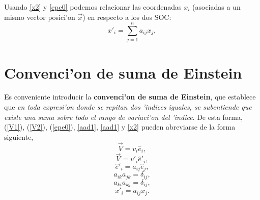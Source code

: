 Usando \eqref{x2} y \eqref{epe0} podemos relacionar las coordenadas $x_i$ (asociadas a un mismo vector posici'on $\vec{x}$) en respecto a los dos SOC:
\begin{equation}
\boxed{x'_i=\sum_{j=1}^na_{ij}x_j,} \label{xpax0}
\end{equation}


\section{Convenci'on de suma de Einstein}

Es conveniente introducir la \textbf{convenci'on de suma de Einstein}, que establece que \textit{en toda expresi'on donde se repitan dos 'indices iguales, se subentiende que existe una suma sobre todo el rango de variaci'on del 'indice}.  De esta forma, (\ref{V1}), (\ref{V2}),  (\ref{epe0}), \eqref{aad1}, \eqref{aad1} y \eqref{x2} pueden abreviarse de la forma siguiente,
\begin{equation}\label{V1b}
\vec{V}=v_i\hat{e}_i,
\end{equation}
\begin{equation}\label{V2b}
\vec{V}=v'_i\hat{e}'_i,
\end{equation}
\begin{equation}\label{epe}
\hat{e}'_i= a_{ij}\hat{e}_j,
\end{equation}
\begin{equation}\label{aatdel}
a_{ik}a_{jk}=\delta_{ij},
\end{equation}
\begin{equation}
a_{ki}a_{kj}=\delta_{ij},
\end{equation}
\begin{equation}\label{xpax}
x'_i=a_{ij}x_j.
\end{equation}

